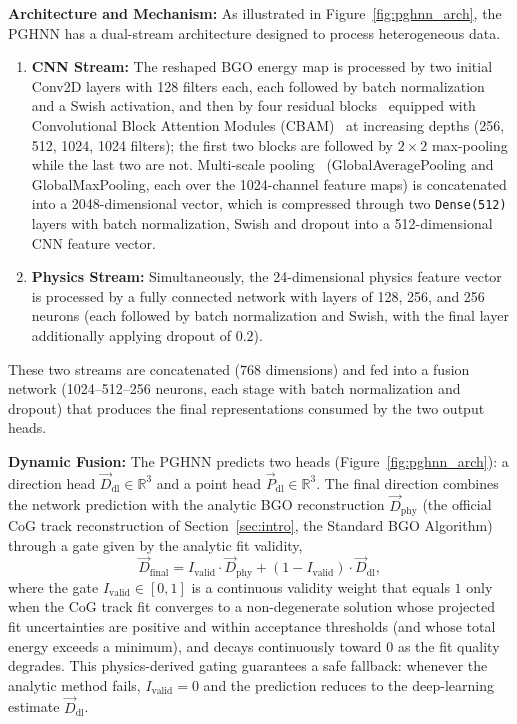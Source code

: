 \documentclass[preprint,12pt]{elsarticle}
\begin{document}
\textbf{Architecture and Mechanism:} As illustrated in Figure~\ref{fig:pghnn_arch}, the PGHNN has a dual-stream architecture designed to process heterogeneous data.
\begin{enumerate}
    \item \textbf{CNN Stream:} The reshaped BGO energy map is processed by two initial Conv2D layers with 128 filters each, each followed by batch normalization and a Swish activation, and then by four residual blocks~\cite{he2016deep} equipped with Convolutional Block Attention Modules (CBAM)~\cite{woo2018cbam} at increasing depths (256, 512, 1024, 1024 filters); the first two blocks are followed by $2\times2$ max-pooling while the last two are not. Multi-scale pooling~\cite{szegedy2016rethinking} (GlobalAveragePooling and GlobalMaxPooling, each over the 1024-channel feature maps) is concatenated into a 2048-dimensional vector, which is compressed through two \texttt{Dense(512)} layers with batch normalization, Swish and dropout into a 512-dimensional CNN feature vector.
    \item \textbf{Physics Stream:} Simultaneously, the 24-dimensional physics feature vector is processed by a fully connected network with layers of 128, 256, and 256 neurons (each followed by batch normalization and Swish, with the final layer additionally applying dropout of $0.2$).
\end{enumerate}
These two streams are concatenated ($768$ dimensions) and fed into a fusion network (1024--512--256 neurons, each stage with batch normalization and dropout) that produces the final representations consumed by the two output heads.

\textbf{Dynamic Fusion:} The PGHNN predicts two heads (Figure~\ref{fig:pghnn_arch}): a direction head $\vec{D}_{\text{dl}}\in\mathbb{R}^{3}$ and a point head $\vec{P}_{\text{dl}}\in\mathbb{R}^{3}$. The final direction combines the network prediction with the analytic BGO reconstruction $\vec{D}_{\text{phy}}$ (the official CoG track reconstruction of Section~\ref{sec:intro}, the Standard BGO Algorithm) through a gate given by the analytic fit validity,
\begin{equation}
\vec{D}_{\text{final}} = I_{\text{valid}}\cdot \vec{D}_{\text{phy}} + (1-I_{\text{valid}})\cdot \vec{D}_{\text{dl}},
\end{equation}
where the gate $I_{\text{valid}}\in[0,1]$ is a continuous validity weight that equals $1$ only when the CoG track fit converges to a non-degenerate solution whose projected fit uncertainties are positive and within acceptance thresholds (and whose total energy exceeds a minimum), and decays continuously toward $0$ as the fit quality degrades. This physics-derived gating guarantees a safe fallback: whenever the analytic method fails, $I_{\text{valid}}=0$ and the prediction reduces to the deep-learning estimate $\vec{D}_{\text{dl}}$.
\end{document}
